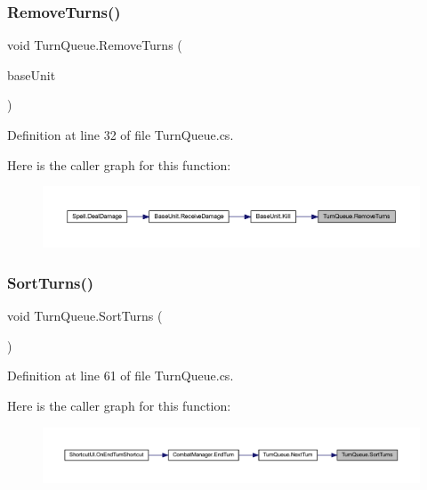 \subsubsection{\texorpdfstring{RemoveTurns()}{RemoveTurns()}}
{\footnotesize\ttfamily void Turn\+Queue.\+Remove\+Turns (\begin{DoxyParamCaption}\item[{\mbox{\hyperlink{class_base_unit}{Base\+Unit}}}]{base\+Unit }\end{DoxyParamCaption})}



Definition at line 32 of file Turn\+Queue.\+cs.

Here is the caller graph for this function\+:
\nopagebreak
\begin{figure}[H]
\begin{center}
\leavevmode
\includegraphics[width=350pt]{class_turn_queue_af6ee9af337f42a417812f4bc96f8d600_icgraph}
\end{center}
\end{figure}
\mbox{\label{class_turn_queue_afadc89a92617f7b2ee4e93025d2f2217}} 
\subsubsection{\texorpdfstring{SortTurns()}{SortTurns()}}
{\footnotesize\ttfamily void Turn\+Queue.\+Sort\+Turns (\begin{DoxyParamCaption}{ }\end{DoxyParamCaption})}



Definition at line 61 of file Turn\+Queue.\+cs.

Here is the caller graph for this function\+:
\nopagebreak
\begin{figure}[H]
\begin{center}
\leavevmode
\includegraphics[width=350pt]{class_turn_queue_afadc89a92617f7b2ee4e93025d2f2217_icgraph}
\end{center}
\end{figure}
\mbox{\label{class_turn_queue_a7f1a7e7055e613cbd17f1d76d9bfd261}} 
